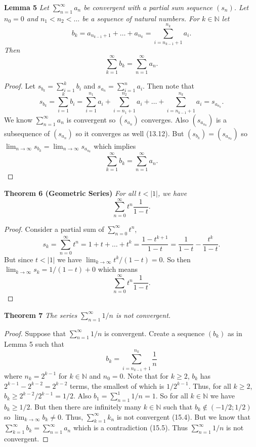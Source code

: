\documentclass{article}
\begin{document}
\begin{flushleft}
\textbf{Lemma 5}
\textsl{Let $\sum_{n=1}^{\infty} a_n$ be convergent with a partial sum sequence $(s_n)$. Let $n_0 = 0$ and $n_1 < n_2 < \dots$ be a sequence of natural numbers. For $k \in \mathbb{N}$ let
\[
b_k = a_{n_{k-1}+1} + \dots + a_{n_k} = \sum_{i = n_{k-1} + 1}^{n_k} a_i.
\]
Then
\[
\sum_{k=1}^{\infty} b_k = \sum_{n=1}^{\infty} a_n.
\]}
\begin{proof}
Let $s_{b_k} = \sum_{i=1}^{k} b_i$ and $s_{a_n} = \sum_{i=1}^{n} a_i$. Then note that
\[
s_{b_k} = \sum_{i=1}^{k} b_i = \sum_{i=1}^{n_1} a_i + \sum_{i = n_{1} + 1}^{n_2} a_i + \dots + \sum_{i = n_{k-1} + 1}^{n_k} a_i = s_{a_{n_k}}.
\]
We know $\sum_{n=1}^{\infty} a_n$ is convergent so $(s_{a_n})$ converges. Also $(s_{a_{n_k}})$ is a subsequence of $(s_{a_n})$ so it converges as well (13.12). But $(s_{b_k}) = (s_{a_{n_k}})$ so $\lim_{n \rightarrow \infty} s_{b_k} = \lim_{n \rightarrow \infty} s_{a_{n_k}}$ which implies
\[
\sum_{k=1}^{\infty} b_k = \sum_{n=1}^{\infty} a_n.
\]
\end{proof}

\textbf{Theorem 6 (Geometric Series)}
\textsl{For all $t < |1|$, we have
\[
\sum_{n=0}^{\infty} t^n \frac{1}{1-t}.
\]}
\begin{proof}
Consider a partial sum of $\sum_{n=0}^{\infty} t^n$,
\[
s_k = \sum_{n=0}^{\infty} t^n= 1+t+\dots+t^k = \frac{1-t^{k+1}}{1-t} = \frac{1}{1-t} - \frac{t^k}{1-t}.
\]
But since $t < |1|$ we have $\lim_{k \rightarrow \infty} t^k/(1-t) = 0$. So then $\lim_{k \rightarrow \infty} s_k = 1/(1-t) + 0$ which means
\[
\sum_{n=0}^{\infty} t^n \frac{1}{1-t}.
\]
\end{proof}

\textbf{Theorem 7}
\textsl{The series $\sum_{n=1}^{\infty} 1/n$ is not convergent.}
\begin{proof}
Suppose that $\sum_{n=1}^{\infty} 1/n$ is convergent. Create a sequence $(b_k)$ as in Lemma 5 such that
\[
b_k = \sum_{i = n_{k-1} + 1}^{n_k} \frac{1}{n}
\]
where $n_k = 2^{k-1}$ for $k \in \mathbb{N}$ and $n_0 = 0$. Note that for $k \geq 2$, $b_k$ has $2^{k-1} - 2^{k-2} = 2^{k-2}$ terms, the smallest of which is $1/2^{k-1}$. Thus, for all $k \geq 2$, $b_k \geq 2^{k-2}/2^{k-1} = 1/2$. Also $b_1 = \sum_{n=1}^{1} 1/n = 1$. So for all $k \in \mathbb{N}$ we have $b_k \geq 1/2$. But then there are infinitely many $k \in \mathbb{N}$ such that $b_k \notin (-1/2 ; 1/2)$ so $\lim_{k \rightarrow \infty} b_k \neq 0$. Thus, $\sum_{k=1}^{\infty} k_n$ is not convergent (15.4). But we know that $\sum_{k=1}^{\infty} b_k = \sum_{n=1}^{\infty} a_n$ which is a contradiction (15.5). Thus $\sum_{n=1}^{\infty} 1/n$ is not convergent.
\end{proof}


\end{flushleft}
\end{document}
